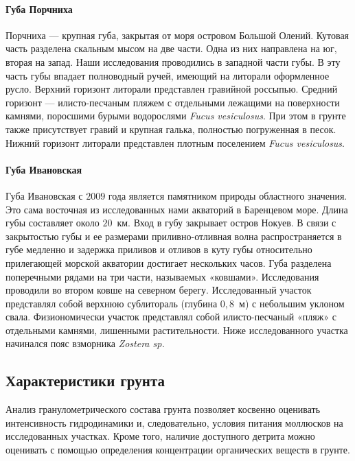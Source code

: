    \paragraph{Губа Порчниха}
Порчниха  ---  крупная   губа,   закрытая   от   моря   островом   Большой   Олений.   
Кутовая часть разделена скальным мысом на две части. 
Одна из них направлена на юг, вторая на запад. 
Наши   исследования   проводились   в   западной   части   губы.   
В   эту   часть   губы   впадает полноводный ручей, имеющий на литорали оформленное русло. 
Верхний горизонт литорали представлен   гравийной   россыпью.   
Средний   горизонт   ---   илисто-песчаным   пляжем   с отдельными   лежащими   на   поверхности   камнями,   поросшими   бурыми   водорослями  {\it Fucus vesiculosus}.   
При   этом   в   грунте   также   присутствует   гравий   и   крупная   галька,   полностью погруженная в песок. 
Нижний горизонт литорали представлен плотным поселением   {\it Fucus  vesiculosus}.

    \paragraph{Губа Ивановская}
Губа Ивановская с $2009$ года является памятником природы областного значения. 
Это сама восточная из исследованных нами акваторий в Баренцевом море. 
Длина губы составляет около $20$~км. 
Вход в губу закрывает  остров Нокуев.
В связи с  закрытостью губы и ее размерами приливно-отливная волна   распространяется   в   губе   медленно   и   задержка   приливов   и   отливов   в   куту   губы относительно прилегающей морской акватории достигает нескольких часов. 
Губа   разделена   поперечными   рядами   на   три   части,   называемых   «ковшами». 
Исследования   проводили   во   втором   ковше   на   северном   берегу.   
Исследованный   участок представлял   собой   верхнюю   сублитораль   (глубина   $0,8$~м)   с   небольшим   уклоном   свала. 
Физиономически участок представлял собой илисто-песчаный «пляж» с отдельными камнями, лишенными растительности. 
Ниже исследованного участка начинался пояс взморника {\it Zostera  sp.} 

        \subsection{Характеристики грунта}
Анализ   гранулометрического   состава   грунта   позволяет   косвенно   оценивать  интенсивность   гидродинамики   и,   следовательно,   условия   питания   моллюсков   на исследованных   участках.   
Кроме   того,   наличие   доступного   детрита   можно   оценивать   с помощью определения концентрации органических веществ в грунте.

